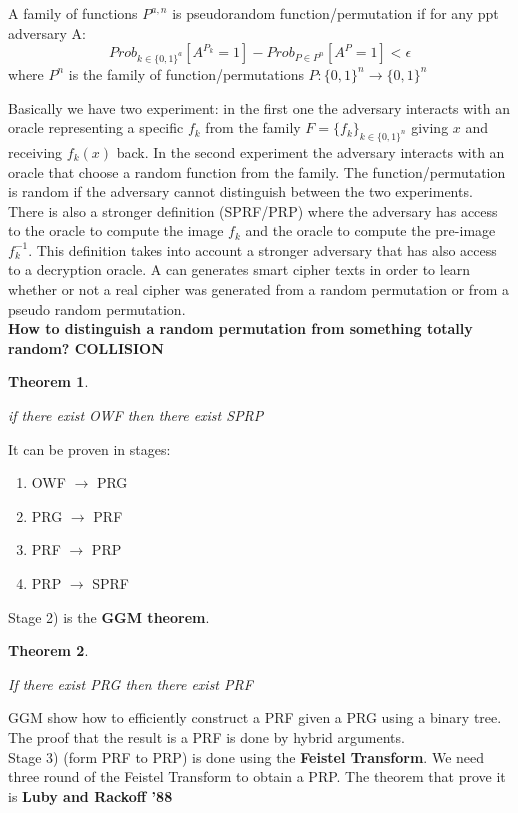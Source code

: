 \documentclass{article}
\newtheorem{thm}{Theorem}[section]
\newenvironment{theorem}{\begin{thm}\begin{rm}}%
{\end{rm}\end{thm}}
\begin{document}
A family of functions $P^{a,n}$ is pseudorandom function/permutation if for any ppt adversary A:
\begin{equation}
Prob_{k \in \{0,1\}^a}[A^{P_k}= 1] - Prob_{P \in P^n}[A^{P}= 1] < \epsilon
\end{equation} 
where $P^n$ is the family of function/permutations $P: \{0,1\}^n \rightarrow \{0,1\}^n$ 

Basically we have two experiment: in the first one the adversary interacts with an oracle representing a specific $f_k$ from the family $F= \{f_k\}_{k \in \{0,1\}^n}$  giving $x$ and receiving $f_k(x)$ back. In the second experiment the adversary interacts with an oracle that choose a random function from the family.
The function/permutation is random if the adversary cannot distinguish between the two experiments.\\

There is also a stronger definition (SPRF/PRP) where the adversary has access to the oracle to compute the image $f_k$ and the oracle to compute the pre-image $f^{-1}_{k}$. This definition takes into account a stronger adversary that has also access to a decryption oracle.  A can generates smart cipher texts in order to learn whether or not a real cipher was generated from a random permutation or from a pseudo random permutation.\\

\textbf{How to distinguish a random permutation from something totally random? COLLISION   }

\begin{theorem}
if there exist OWF then there exist SPRP
\end{theorem}
It can be proven in stages:
\begin{enumerate}
\item OWF $\rightarrow$ PRG 
\item PRG $\rightarrow$ PRF
\item PRF $\rightarrow$ PRP
\item PRP $\rightarrow$ SPRF
\end{enumerate}

Stage 2) is the\textbf{ GGM theorem}.
\begin{theorem}
If there exist PRG then there exist PRF
\end{theorem}
GGM show how to efficiently construct a PRF given a PRG using a binary tree. The proof that the result is a PRF is done by hybrid arguments.\\

Stage 3) (form PRF to PRP) is done using the \textbf{Feistel Transform}. We need three round of the Feistel Transform to obtain a PRP. The theorem that prove it is \textbf{Luby and Rackoff '88}



%
%
\end{document}
